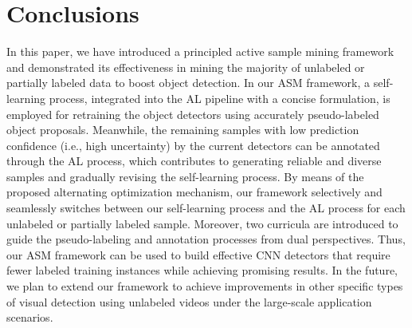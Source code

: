 \documentclass[journal]{IEEEtran}
\begin{document}
{\section{Conclusions}
\label{sec:conc}
In this paper, we have introduced a principled active sample mining framework and demonstrated its effectiveness in mining the majority of unlabeled or partially labeled data to boost object detection. In our {ASM} framework, a {self-learning} process, integrated into the AL pipeline with a concise formulation, is employed for retraining the object detectors using {accurately pseudo-labeled object proposals}. Meanwhile, the remaining samples {with low prediction confidence (i.e., high uncertainty) by the current detectors can be annotated} through {the AL process}, which {contributes to} generating reliable and diverse samples and gradually revising the {self-learning} process. By means of the proposed alternating optimization mechanism, our framework {selectively} and seamlessly switches between our {self-learning} process and the AL process for each unlabeled or partially labeled sample. Moreover, two curricula are introduced to guide the pseudo-labeling and annotation processes from dual perspectives. Thus, our {ASM} framework can be used to build effective CNN detectors that require fewer labeled training instances while achieving promising results. In the future, we plan to extend our framework to achieve improvements in other specific types of visual detection using unlabeled videos under the large-scale application scenarios.


\appendices
}
\end{document}

